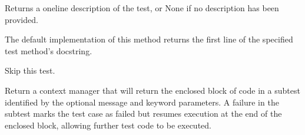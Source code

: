\documentclass[letterpaper,10pt,english]{sphinxmanual}
\begin{document}
\begin{fulllineitems}
\begin{fulllineitems}
\end{fulllineitems}


\begin{fulllineitems}
\label{\detokenize{_autosummary/tests.test_unit.test_df:tests.test_unit.test_df.shortDescription}}
\pysigstartsignatures
{}
\pysigstopsignatures
\sphinxAtStartPar
Returns a one\sphinxhyphen{}line description of the test, or None if no
description has been provided.

\sphinxAtStartPar
The default implementation of this method returns the first line of
the specified test method’s docstring.

\end{fulllineitems}


\begin{fulllineitems}
\label{\detokenize{_autosummary/tests.test_unit.test_df:tests.test_unit.test_df.skipTest}}
\pysigstartsignatures
{}
\pysigstopsignatures
\sphinxAtStartPar
Skip this test.

\end{fulllineitems}


\begin{fulllineitems}
\label{\detokenize{_autosummary/tests.test_unit.test_df:tests.test_unit.test_df.subTest}}
\pysigstartsignatures
{}
\pysigstopsignatures
\sphinxAtStartPar
Return a context manager that will return the enclosed block
of code in a subtest identified by the optional message and
keyword parameters.  A failure in the subtest marks the test
case as failed but resumes execution at the end of the enclosed
block, allowing further test code to be executed.

\end{fulllineitems}


\end{fulllineitems}
\end{document}
